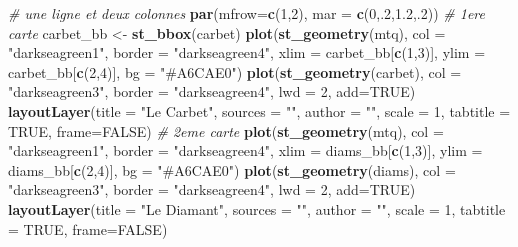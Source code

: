 \documentclass[]{book}
\newenvironment{Shaded}{\begin{snugshade}}{\end{snugshade}}
\newcommand{\KeywordTok}[1]{\textcolor[rgb]{0.13,0.29,0.53}{\textbf{#1}}}
\newcommand{\DataTypeTok}[1]{\textcolor[rgb]{0.13,0.29,0.53}{#1}}
\newcommand{\DecValTok}[1]{\textcolor[rgb]{0.00,0.00,0.81}{#1}}
\newcommand{\FloatTok}[1]{\textcolor[rgb]{0.00,0.00,0.81}{#1}}
\newcommand{\StringTok}[1]{\textcolor[rgb]{0.31,0.60,0.02}{#1}}
\newcommand{\CommentTok}[1]{\textcolor[rgb]{0.56,0.35,0.01}{\textit{#1}}}
\newcommand{\OtherTok}[1]{\textcolor[rgb]{0.56,0.35,0.01}{#1}}
\newcommand{\NormalTok}[1]{#1}
\begin{document}
\begin{Shaded}
\begin{Highlighting}[]
\CommentTok{# une ligne et deux colonnes}
\KeywordTok{par}\NormalTok{(}\DataTypeTok{mfrow=}\KeywordTok{c}\NormalTok{(}\DecValTok{1}\NormalTok{,}\DecValTok{2}\NormalTok{), }\DataTypeTok{mar =} \KeywordTok{c}\NormalTok{(}\DecValTok{0}\NormalTok{,.}\DecValTok{2}\NormalTok{,}\FloatTok{1.2}\NormalTok{,.}\DecValTok{2}\NormalTok{))}
\CommentTok{# 1ere carte}
\NormalTok{carbet_bb <-}\StringTok{ }\KeywordTok{st_bbox}\NormalTok{(carbet)}
\KeywordTok{plot}\NormalTok{(}\KeywordTok{st_geometry}\NormalTok{(mtq), }\DataTypeTok{col =} \StringTok{"darkseagreen1"}\NormalTok{, }\DataTypeTok{border =} \StringTok{"darkseagreen4"}\NormalTok{, }
     \DataTypeTok{xlim =}\NormalTok{ carbet_bb[}\KeywordTok{c}\NormalTok{(}\DecValTok{1}\NormalTok{,}\DecValTok{3}\NormalTok{)], }\DataTypeTok{ylim =}\NormalTok{ carbet_bb[}\KeywordTok{c}\NormalTok{(}\DecValTok{2}\NormalTok{,}\DecValTok{4}\NormalTok{)], }\DataTypeTok{bg =} \StringTok{"#A6CAE0"}\NormalTok{)}
\KeywordTok{plot}\NormalTok{(}\KeywordTok{st_geometry}\NormalTok{(carbet), }\DataTypeTok{col =} \StringTok{"darkseagreen3"}\NormalTok{, }\DataTypeTok{border =} \StringTok{"darkseagreen4"}\NormalTok{, }
     \DataTypeTok{lwd =} \DecValTok{2}\NormalTok{, }\DataTypeTok{add=}\OtherTok{TRUE}\NormalTok{)}
\KeywordTok{layoutLayer}\NormalTok{(}\DataTypeTok{title =} \StringTok{"Le Carbet"}\NormalTok{, }\DataTypeTok{sources =} \StringTok{""}\NormalTok{, }\DataTypeTok{author =} \StringTok{""}\NormalTok{, }\DataTypeTok{scale =} \DecValTok{1}\NormalTok{, }
            \DataTypeTok{tabtitle =} \OtherTok{TRUE}\NormalTok{, }\DataTypeTok{frame=}\OtherTok{FALSE}\NormalTok{)}
\CommentTok{# 2eme carte }
\KeywordTok{plot}\NormalTok{(}\KeywordTok{st_geometry}\NormalTok{(mtq), }\DataTypeTok{col =} \StringTok{"darkseagreen1"}\NormalTok{, }\DataTypeTok{border =} \StringTok{"darkseagreen4"}\NormalTok{, }
     \DataTypeTok{xlim =}\NormalTok{ diams_bb[}\KeywordTok{c}\NormalTok{(}\DecValTok{1}\NormalTok{,}\DecValTok{3}\NormalTok{)], }\DataTypeTok{ylim =}\NormalTok{ diams_bb[}\KeywordTok{c}\NormalTok{(}\DecValTok{2}\NormalTok{,}\DecValTok{4}\NormalTok{)], }\DataTypeTok{bg =} \StringTok{"#A6CAE0"}\NormalTok{)}
\KeywordTok{plot}\NormalTok{(}\KeywordTok{st_geometry}\NormalTok{(diams), }\DataTypeTok{col =} \StringTok{"darkseagreen3"}\NormalTok{, }\DataTypeTok{border =} \StringTok{"darkseagreen4"}\NormalTok{, }
     \DataTypeTok{lwd =} \DecValTok{2}\NormalTok{, }\DataTypeTok{add=}\OtherTok{TRUE}\NormalTok{)}
\KeywordTok{layoutLayer}\NormalTok{(}\DataTypeTok{title =} \StringTok{"Le Diamant"}\NormalTok{, }\DataTypeTok{sources =} \StringTok{""}\NormalTok{, }\DataTypeTok{author =} \StringTok{""}\NormalTok{, }\DataTypeTok{scale =} \DecValTok{1}\NormalTok{, }
            \DataTypeTok{tabtitle =} \OtherTok{TRUE}\NormalTok{, }\DataTypeTok{frame=}\OtherTok{FALSE}\NormalTok{)}
\end{Highlighting}
\end{Shaded}
\end{document}
